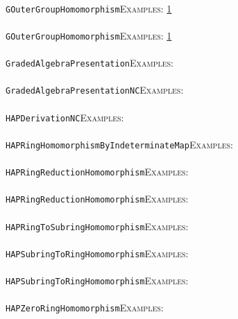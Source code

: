 \documentclass[a4paper,11pt]{report}
\begin{document}
{{ \\
 \texttt{GOuterGroupHomomorphism}{\nobreakspace}{\nobreakspace}{\nobreakspace}{\nobreakspace}\textsc{Examples:} \href{../www/SideLinks/About/aboutCoefficientSequence.html} {1}{\nobreakspace} \\
 \\
 \texttt{GOuterGroupHomomorphism}{\nobreakspace}{\nobreakspace}{\nobreakspace}{\nobreakspace}\textsc{Examples:} \href{../www/SideLinks/About/aboutCoefficientSequence.html} {1}{\nobreakspace} \\
 \\
 \texttt{GradedAlgebraPresentation}{\nobreakspace}{\nobreakspace}{\nobreakspace}{\nobreakspace}\textsc{Examples:} \\
 \\
 \texttt{GradedAlgebraPresentationNC}{\nobreakspace}{\nobreakspace}{\nobreakspace}{\nobreakspace}\textsc{Examples:} \\
 \\
 \texttt{HAPDerivationNC}{\nobreakspace}{\nobreakspace}{\nobreakspace}{\nobreakspace}\textsc{Examples:} \\
 \\
 \texttt{HAPRingHomomorphismByIndeterminateMap}{\nobreakspace}{\nobreakspace}{\nobreakspace}{\nobreakspace}\textsc{Examples:} \\
 \\
 \texttt{HAPRingReductionHomomorphism}{\nobreakspace}{\nobreakspace}{\nobreakspace}{\nobreakspace}\textsc{Examples:} \\
 \\
 \texttt{HAPRingReductionHomomorphism}{\nobreakspace}{\nobreakspace}{\nobreakspace}{\nobreakspace}\textsc{Examples:} \\
 \\
 \texttt{HAPRingToSubringHomomorphism}{\nobreakspace}{\nobreakspace}{\nobreakspace}{\nobreakspace}\textsc{Examples:} \\
 \\
 \texttt{HAPSubringToRingHomomorphism}{\nobreakspace}{\nobreakspace}{\nobreakspace}{\nobreakspace}\textsc{Examples:} \\
 \\
 \texttt{HAPSubringToRingHomomorphism}{\nobreakspace}{\nobreakspace}{\nobreakspace}{\nobreakspace}\textsc{Examples:} \\
 \\
 \texttt{HAPZeroRingHomomorphism}{\nobreakspace}{\nobreakspace}{\nobreakspace}{\nobreakspace}\textsc{Examples:} \\
 \\
}}
\end{document}
